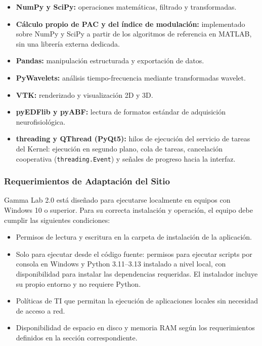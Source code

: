 \documentclass[12pt, letterpaper]{article}
\begin{document}
\begin{itemize}

    \item \textbf{NumPy y SciPy:} operaciones matemáticas, filtrado y
    transformadas.

    \item \textbf{Cálculo propio de PAC y del índice de modulación:}
    implementado sobre NumPy y SciPy a partir de los algoritmos de referencia
    en MATLAB, sin una librería externa dedicada.

    \item \textbf{Pandas:} manipulación estructurada y exportación de datos.

    \item \textbf{PyWavelets:} análisis tiempo-frecuencia mediante
    transformadas wavelet.

    \item \textbf{VTK:} renderizado y visualización 2D y 3D.

    \item \textbf{pyEDFlib y pyABF:} lectura de formatos estándar de
    adquisición neurofisiológica.

    \item \textbf{threading y QThread (PyQt5):} hilos de ejecución del
    servicio de tareas del Kernel: ejecución en segundo plano, cola de tareas,
    cancelación cooperativa (\texttt{threading.Event}) y señales de progreso
    hacia la interfaz.

\end{itemize}

\subsubsection{Requerimientos de Adaptación del Sitio}

Gamma Lab 2.0 está diseñado para ejecutarse localmente en equipos con
Windows 10 o superior. Para su correcta instalación y operación, el equipo
debe cumplir las siguientes condiciones:

\begin{itemize}

    \item Permisos de lectura y escritura en la carpeta de instalación de
    la aplicación.

    \item Solo para ejecutar desde el código fuente: permisos para ejecutar
    scripts por consola en Windows y Python 3.11--3.13 instalado a nivel
    local, con disponibilidad para instalar las dependencias requeridas. El
    instalador incluye su propio entorno y no requiere Python.

    \item Políticas de TI que permitan la ejecución de aplicaciones locales
    sin necesidad de acceso a red.

    \item Disponibilidad de espacio en disco y memoria RAM según los
    requerimientos definidos en la sección correspondiente.

\end{itemize}
\end{document}

